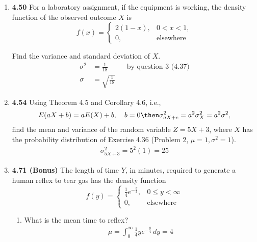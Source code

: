 \documentclass[basic, header]{nosvagor-notes}
\begin{document}
\begin{enumerate}[leftmargin=1.5em, itemsep=2em]
  \item \textbf{4.50} For a laboratory assignment, if the equipment is working,
    the density function of the observed outcome \(X\) is
    \[%
      f(x) =
      \begin{cases}
        2(1-x), & 0 < x < 1, \\
        0,      & \text{elsewhere}
      \end{cases}
    \]%

    Find the variance and standard deviation of \(X\).
    \begin{align*}
      \sigma^2 &= \boxed{\frac{1}{18}} && \text{by question 3 (4.37)} \\
      \sigma &= \boxed{\sqrt{\frac{1}{18}}}
    \end{align*}

  \newpage %

  \item \textbf{4.54} Using Theorem 4.5 and Corollary 4.6, i.e.,
    \[%
      E(aX + b) = a E(X) + b, \quad b = 0 \then \sigma^2_{aX+c} = a^2 \sigma_X^2 = a^2 \sigma^2,
    \]%
    find the mean and variance of the random variable \(Z = 5X +3\), where
    \(X\) has the probability distribution of Exercise 4.36 (Problem 2, \(\mu = 1, \sigma^2 = 1\)).
    \begin{align*}
      \sigma^2_{5X+3} = 5^2(1) = \boxed{25}
    \end{align*}

  \item \textbf{4.71 (Bonus)} The length of time \(Y\), in minutes, required
    to generate a human reflex to tear gas has the density function
    \[%
      f(y) =
      \begin{cases}
        \frac{1}{4}e^{-\frac{y}{4}}, & 0 \leq y < \infty \\
         0, & \text{elsewhere}
      \end{cases}
    \]%
    \begin{enumerate}[leftmargin=1.6em]

      \item What is the mean time to reflex?
        \begin{align*}
          \mu = \int_{0}^{\infty} \frac{1}{4}ye^{-\frac{y}{4}}\, dy = \boxed{4}
        \end{align*}


\end{enumerate}
\end{enumerate}
\end{document}
